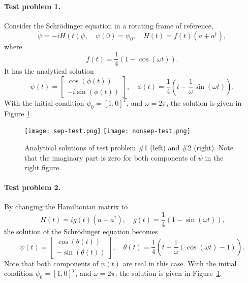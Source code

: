 \documentclass[11pt]{article}
\begin{document}



\paragraph{Test problem 1.}
Consider the Schr\"odinger equation in a rotating frame of reference,
\begin{equation}\label{eq_shrodinger}
\dot{\psi} = -i H(t) \psi,\quad \psi(0) = \psi_0,\quad H(t) = f(t) (a +a^\dag),
\end{equation}
where
\[
f(t) = \frac{1}{4}\left(1 - \cos(\omega t)\right).
\]
It has the analytical solution
\[
\psi(t) = \begin{bmatrix}
  \cos(\phi(t))\\
  -i\sin(\phi(t))
  \end{bmatrix},\quad \phi(t) = \frac{1}{4}\left( t - \frac{1}{\omega}\sin(\omega t)\right).
\]
With the initial condition $\psi_0=[1, 0]^T$, and $\omega=2\pi$, the solution is given in Figure \ref{fig_2}.
  \begin{figure}
    \begin{center}
    \texttt{[image: sep-test.png]}
    \texttt{[image: nonsep-test.png]}
    \caption{Analytical solutions of test problem \#1 (left) and \#2 (right). Note that the imaginary part is zero for both
      components of $\psi$ in the right figure.}\label{fig_2}
    \end{center}
  \end{figure}

\paragraph{Test problem 2.}
By changing the Hamiltonian matrix to
\begin{equation}\
H(t) = i g(t) (a - a^\dag),\quad g(t) = \frac{1}{4}\left(1 - \sin(\omega t)\right),
\end{equation}
the solution of the Schr\"odinger equation becomes
\[
\psi(t) = \begin{bmatrix}
  \cos(\theta(t))\\
  -\sin(\theta(t))
  \end{bmatrix},\quad \theta(t) = \frac{1}{4}\left( t + \frac{1}{\omega}(\cos(\omega t) - 1)\right).
\]
Note that both components of $\psi(t)$ are real in this case.
With the initial condition $\psi_0=[1, 0]^T$, and $\omega=2\pi$, the solution is given in Figure~\ref{fig_2}.
  
\end{document}
